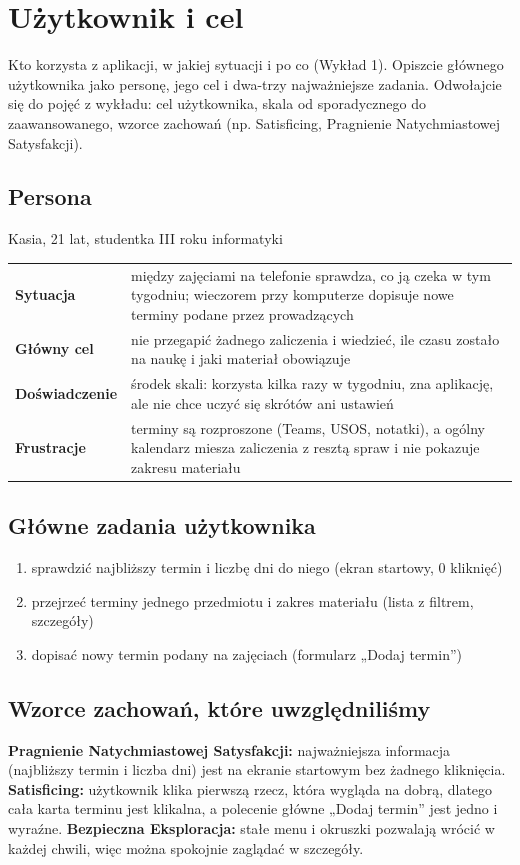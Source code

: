 \section{Użytkownik i cel}\label{sec:uzytkownik}

\begin{instrukcja}[wymagane]
Kto korzysta z aplikacji, w jakiej sytuacji i po co (Wykład 1). Opiszcie głównego użytkownika jako
personę, jego cel i dwa-trzy najważniejsze zadania. Odwołajcie się do pojęć z wykładu: cel użytkownika,
skala od sporadycznego do zaawansowanego, wzorce zachowań (np. Satisficing, Pragnienie Natychmiastowej
Satysfakcji).
\end{instrukcja}

\subsection{Persona}
\begin{ramka}{Kasia, 21 lat, studentka III roku informatyki}
\begin{tabularx}{\linewidth}{@{}>{\bfseries}p{3.6cm}L@{}}
Sytuacja & między zajęciami na telefonie sprawdza, co ją czeka w tym tygodniu; wieczorem przy komputerze dopisuje nowe terminy podane przez prowadzących \\
Główny cel & nie przegapić żadnego zaliczenia i wiedzieć, ile czasu zostało na naukę i jaki materiał obowiązuje \\
Doświadczenie & środek skali: korzysta kilka razy w tygodniu, zna aplikację, ale nie chce uczyć się skrótów ani ustawień \\
Frustracje & terminy są rozproszone (Teams, USOS, notatki), a ogólny kalendarz miesza zaliczenia z resztą spraw i nie pokazuje zakresu materiału \\
\end{tabularx}
\end{ramka}

\subsection{Główne zadania użytkownika}
\begin{enumerate}
  \item sprawdzić najbliższy termin i liczbę dni do niego (ekran startowy, 0 kliknięć)
  \item przejrzeć terminy jednego przedmiotu i zakres materiału (lista z filtrem, szczegóły)
  \item dopisać nowy termin podany na zajęciach (formularz „Dodaj termin”)
\end{enumerate}

\subsection{Wzorce zachowań, które uwzględniliśmy}
\textbf{Pragnienie Natychmiastowej Satysfakcji:} najważniejsza informacja (najbliższy termin i liczba
dni) jest na ekranie startowym bez żadnego kliknięcia.
\textbf{Satisficing:} użytkownik klika pierwszą rzecz, która wygląda na dobrą, dlatego cała karta
terminu jest klikalna, a polecenie główne „Dodaj termin” jest jedno i wyraźne.
\textbf{Bezpieczna Eksploracja:} stałe menu i okruszki pozwalają wrócić w każdej chwili, więc można
spokojnie zaglądać w szczegóły.
